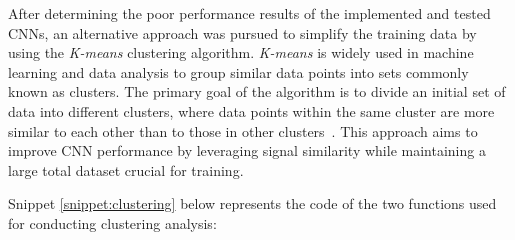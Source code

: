 \documentclass[12pt,italian]{report}
\begin{document}
After determining the poor performance results of the implemented and tested CNNs, an alternative approach was pursued to simplify the training data by using the \textit{K-means} clustering algorithm. \textit{K-means} is widely used in machine learning and data analysis to group similar data points into sets commonly known as clusters. The primary goal of the algorithm is to divide an initial set of data into different clusters, where data points within the same cluster are more similar to each other than to those in other clusters~\cite{cluster}. This approach aims to improve CNN performance by leveraging signal similarity while maintaining a large total dataset crucial for training.

Snippet \ref{snippet:clustering} below represents the code of the two functions used for conducting clustering analysis:
\end{document}
